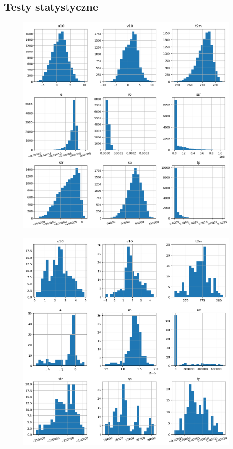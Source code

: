 \subsection{Testy statystyczne}

\begin{figure}[H]
    \centering
    \includegraphics[width=\textwidth]{images/hist.png}
    \caption{}
    \label{real-hist}
\end{figure}

\begin{figure}[H]
    \centering
    \includegraphics[width=\textwidth]{images/svr_hist.png}
    \caption{}
    \label{svr-hist}
\end{figure}

